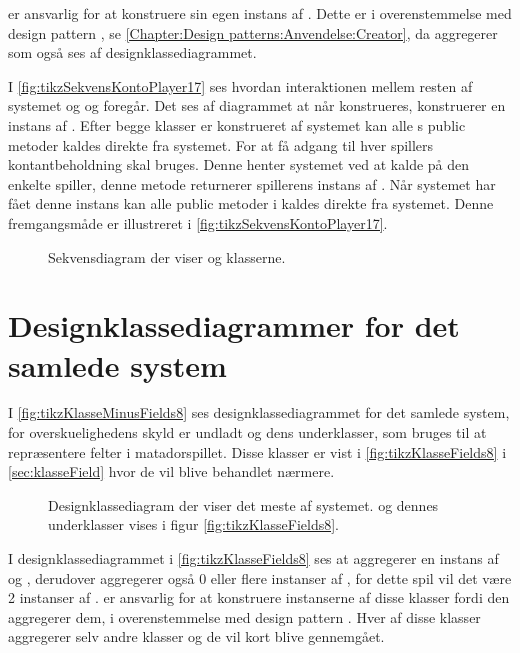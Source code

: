  er ansvarlig for at konstruere sin egen instans af . Dette er i overenstemmelse med design pattern , se \vref{Chapter:Design patterns:Anvendelse:Creator}, da  aggregerer  som også ses af designklassediagrammet.

I \vref{fig:tikzSekvensKontoPlayer17} ses hvordan interaktionen mellem resten af systemet og  og  foregår. Det ses af diagrammet at når  konstrueres, konstruerer  en instans af . Efter begge klasser er konstrueret af systemet kan alle s public metoder kaldes direkte fra systemet. For at få adgang til hver spillers kontantbeholdning skal  bruges. Denne henter systemet ved at kalde  på den enkelte spiller, denne metode returnerer spillerens instans af . Når systemet har fået denne instans kan alle public metoder i  kaldes direkte fra systemet. Denne fremgangsmåde er illustreret i \vref{fig:tikzSekvensKontoPlayer17}.

\begin{figure}
\caption{Sekvensdiagram der viser  og  klasserne.}\label{fig:tikzSekvensKontoPlayer17}
\centering

\end{figure}

\FloatBarrier
\section{Designklassediagrammer for det samlede system}\label{sec:klasseSamlet}
I \vref{fig:tikzKlasseMinusFields8} ses designklassediagrammet for det samlede system, for overskuelighedens skyld er undladt  og dens underklasser, som bruges til at repræsentere felter i matadorspillet. Disse klasser er vist i \vref{fig:tikzKlasseFields8} i \vref{sec:klasseField} hvor de vil blive behandlet nærmere.

\begin{figure}
\caption{Designklassediagram der viser det meste af systemet.  og dennes underklasser vises i figur \vref{fig:tikzKlasseFields8}.}\label{fig:tikzKlasseMinusFields8}
\centering

\end{figure}

I designklassediagrammet i \vref{fig:tikzKlasseFields8} ses at  aggregerer en instans af  og , derudover aggregerer  også 0 eller flere instanser af , for dette spil vil det være 2 instanser af .  er ansvarlig for at konstruere instanserne af disse klasser fordi den aggregerer dem, i overenstemmelse med design pattern . Hver af disse klasser aggregerer selv andre klasser og de vil kort blive gennemgået.

